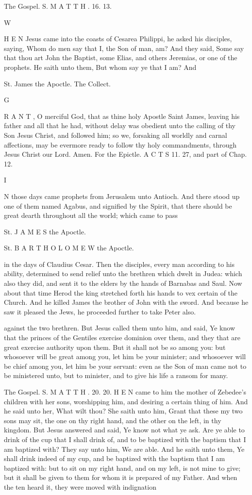 The Gospel. S. M A T T H . 16. 13.

W

H E N Jesus came into the coasts of Cesarea Philippi, he asked his disciples, saying, Whom do men say that I, the Son of man, am? And they said, Some say that thou art John the Baptist, some Elias, and others Jeremias, or one of the prophets. He saith unto them, But whom say ye that I am? And

St. James the Apoctle. The Collect.

G

R A N T , O merciful God, that as thine holy Apostle Saint James, leaving his father and all that he had, without delay was obedient unto the calling of thy Son Jesus Christ, and followed him; so we, forsaking all worldly and carnal affections, may be evermore ready to follow thy holy commandments, through Jesus Christ our Lord. Amen. For the Epictle. A C T S 11. 27, and part of Chap. 12.

I

N those days came prophets from Jerusalem unto Antioch. And there stood up one of them named Agabus, and signified by the Spirit, that there should be great dearth throughout all the world; which came to pass

St. J A M E S the Apoctle.

St. B A R T H O L O M E W the Apoctle.

in the days of Claudius Cesar. Then the disciples, every man according to his ability, determined to send relief unto the brethren which dwelt in Judea: which also they did, and sent it to the elders by the hands of Barnabas and Saul. Now about that time Herod the king stretched forth his hands to vex certain of the Church. And he killed James the brother of John with the sword. And because he saw it pleased the Jews, he proceeded further to take Peter also.

against the two brethren. But Jesus called them unto him, and said, Ye know that the princes of the Gentiles exercise dominion over them, and they that are great exercise authority upon them. But it shall not be so among you: but whosoever will be great among you, let him be your minister; and whosoever will be chief among you, let him be your servant: even as the Son of man came not to be ministered unto, but to minister, and to give his life a ransom for many.

The Gospel. S. M A T T H . 20. 20. H E N came to him the mother of Zebedee’s children with her sons, worshipping him, and desiring a certain thing of him. And he said unto her, What wilt thou? She saith unto him, Grant that these my two sons may sit, the one on thy right hand, and the other on the left, in thy kingdom. But Jesus answered and said, Ye know not what ye ask. Are ye able to drink of the cup that I shall drink of, and to be baptized with the baptism that I am baptized with? They say unto him, We are able. And he saith unto them, Ye shall drink indeed of my cup, and be baptized with the baptism that I am baptized with: but to sit on my right hand, and on my left, is not mine to give; but it shall be given to them for whom it is prepared of my Father. And when the ten heard it, they were moved with indignation

